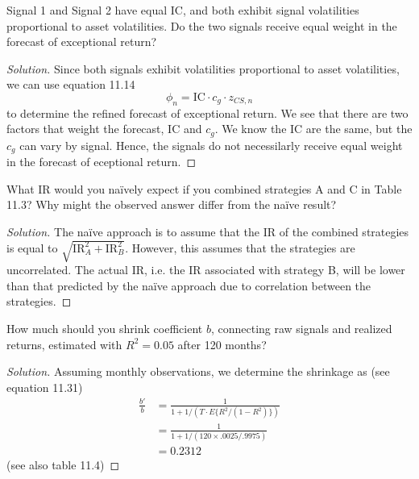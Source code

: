 \begin{problem}{11.1}
  Signal 1 and Signal 2 have equal IC, and both exhibit signal volatilities proportional to asset volatilities. Do the two signals receive equal weight in the forecast of exceptional return?
\end{problem}

\begin{proof}[Solution]
  Since both signals exhibit volatilities proportional to asset volatilities, we can use equation 11.14 
  \begin{equation*}
   \phi_{n}=\mathrm{IC}\cdot c_{g} \cdot z_{CS,n}
  \end{equation*}
  to determine the refined forecast of exceptional return. We see that there are two factors that weight the forecast, IC and $c_{g}$. We know the IC are the same, but the $c_{g}$ can vary by signal. Hence, the signals do not necessilarly receive equal weight in the forecast of eceptional return.
\end{proof}

\begin{problem}{11.2}
  What IR would you na\"{i}vely expect if you combined strategies A and C in Table 11.3? Why might the observed answer differ from the na\"{i}ve result?
\end{problem}

\begin{proof}[Solution]
  The na\"{i}ve approach is to assume that the IR of the combined strategies is equal to $\sqrt{\mathrm{IR}_{A}^{2}+\mathrm{IR}_{B}^{2}}$. However, this assumes that the strategies are uncorrelated. The actual IR, i.e. the IR associated with strategy B, will be lower than that predicted by the na\"{i}ve approach due to correlation between the strategies.
\end{proof}

\begin{problem}{11.3}
  How much should you shrink coefficient $b$, connecting raw signals and realized returns, estimated with $R^{2}=0.05$ after 120 months?
\end{problem}

\begin{proof}[Solution]
  Assuming monthly observations, we determine the shrinkage as (see equation 11.31)
  \begin{align*}
   \frac{b'}{b} &=\frac{1}{1+1/(T\cdot E\{R^{2}/(1-R^{2})\})}\\
		&=\frac{1}{1+1/(120 \times .0025/.9975)}\\
		&=0.2312
  \end{align*}
  (see also table 11.4)
\end{proof}